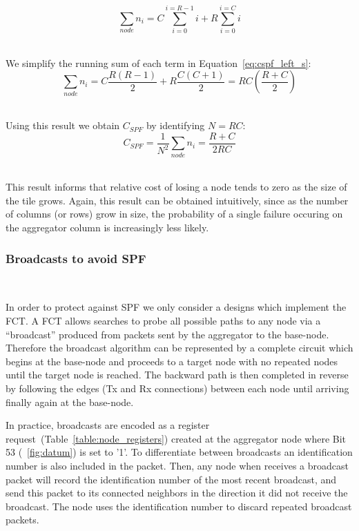 \begin{equation}
  \sum_{node}n_{i} = C\sum_{i=0}^{i=R-1}i + R\sum_{i=0}^{i=C}i
\end{equation}~\label{eq:cspf_left_s}

We simplify the running sum of each term in Equation~\ref{eq:cspf_left_s}:
\begin{equation}
  \sum_{node}n_{i} = C\frac{R(R-1)}{2} + R\frac{C(C+1)}{2} = RC(\frac{R+C}{2})
\end{equation}~\label{eq:cspf_left_e}

Using this result we obtain $C_{SPF}$ by identifying $N = RC$:
\begin{equation}
  C_{SPF} = \frac{1}{N^{2}}\sum_{node}n_{i} = \boxed{\frac{R+C}{2RC}}
\end{equation}~\label{eq:cspf_left_fin}

This result informs that relative cost of losing a node tends to zero as the size of the tile grows.
Again, this result can be obtained intuitively, since as the number of columns (or rows) grow in size, the probability of a single failure occuring on the aggregator column is increasingly less likely.

\subsubsection{Broadcasts to avoid SPF}~\label{sec:broadcast}

In order to protect against SPF we only consider a designs which implement the FCT.
A FCT allows searches to probe all possible paths to any node via a ``broadcast'' produced from packets sent by the aggregator to the base-node.
Therefore the broadcast algorithm can be represented by a complete circuit which begins at the base-node and proceeds to a target node with no repeated nodes until the target node is reached.
The backward path is then completed in reverse by following the edges (Tx and Rx connections) between each node until arriving finally again at the base-node.

In practice, broadcasts are encoded as a register request~(Table~\ref{table:node_registers}) created at the aggregator node where Bit 53 (~\ref{fig:datum}) is set to '1'. 
To differentiate between broadcasts an identification number is also included in the packet.
Then, any node when receives a broadcast packet will record the identification number of the most recent broadcast, and send this packet to its connected neighbors in the direction it did not receive the broadcast.
The node uses the identification number to discard repeated broadcast packets.

